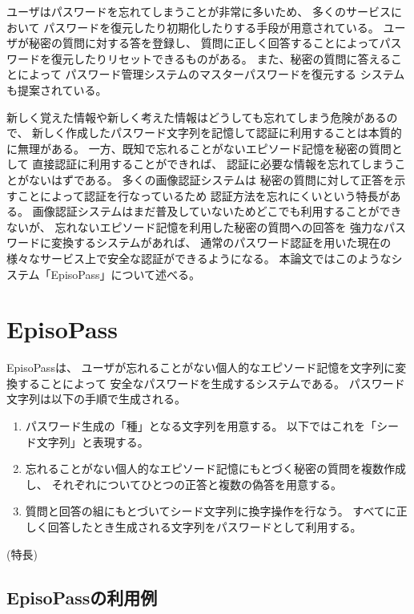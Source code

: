 \documentclass[twoside]{wiss}
\begin{document}
ユーザはパスワードを忘れてしまうことが非常に多いため、
多くのサービスにおいて
パスワードを復元したり初期化したりする手段が用意されている。
ユーザが秘密の質問に対する答を登録し、
質問に正しく回答することによってパスワードを復元したりリセットできるものがある。
また、秘密の質問に答えることによって
パスワード管理システムのマスターパスワードを復元する
システム\cite{平野亮:2011-11-07}も提案されている。

新しく覚えた情報や新しく考えた情報はどうしても忘れてしまう危険があるので、
新しく作成したパスワード文字列を記憶して認証に利用することは本質的に無理がある。
一方、既知で忘れることがないエピソード記憶を秘密の質問として
直接認証に利用することができれば、
認証に必要な情報を忘れてしまうことがないはずである。
多くの画像認証システム\cite{小池英樹:2006-05-15}は
秘密の質問に対して正答を示すことによって認証を行なっているため
認証方法を忘れにくいという特長がある。
%
画像認証システムはまだ普及していないためどこでも利用することができないが、
忘れないエピソード記憶を利用した秘密の質問への回答を
強力なパスワードに変換するシステムがあれば、
通常のパスワード認証を用いた現在の様々なサービス上で安全な認証ができるようになる。
本論文ではこのようなシステム「EpisoPass」について述べる。

\section{EpisoPass}

EpisoPassは、
ユーザが忘れることがない個人的なエピソード記憶を文字列に変換することによって
安全なパスワードを生成するシステムである。
パスワード文字列は以下の手順で生成される。

\begin{enumerate}
\item パスワード生成の「種」となる文字列を用意する。
以下ではこれを「シード文字列」と表現する。
\item 忘れることがない個人的なエピソード記憶にもとづく秘密の質問を複数作成し、
それぞれについてひとつの正答と複数の偽答を用意する。
\item 質問と回答の組にもとづいてシード文字列に換字操作を行なう。
すべてに正しく回答したとき生成される文字列をパスワードとして利用する。
\end{enumerate}

(特長)

\subsection{EpisoPassの利用例}
\end{document}
